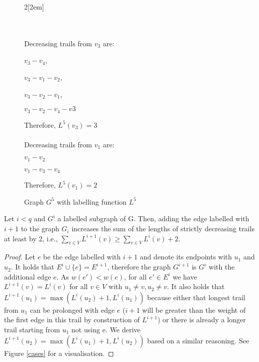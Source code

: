 \begin{isabellebody}
\begin{isamarkuptext}
\begin{figure}
	\begin{multicols}{2}[\columnsep2em] 

	\\
		\columnbreak
		\vspace{7cm}
		\ \\
		Decreasing trails from $v_3$ are: 
		
		$v_3-v_4$,  
		
		$v_3-v_1-v_2$, 
		
		$v_3-v_2-v_1$,
		
		$v_3-v_2-v_4-v3$
		
		Therefore, $L^5(v_3) = 3$\\ \ \\

		Decreasing trails from $v_1$ are:
		
		$v_1-v_2$
		
		$v_1-v_3-v_4$
		
		Therefore, $L^5(v_1) = 2$
	\end{multicols}
	
  \caption{Graph $G^5$ with labelling function $L^5$}\label{exampleSubgraph}
\end{figure}

\begin{lemma}\label{sum}
	Let $i < q$ and $G^i$ a labelled subgraph of G. Then, adding the edge labelled with $i+1$ to the 
graph $G_i$ increases the sum of the lengths of strictly decreasing trails at least by 2, i.e.,
	$\sum_{v\in V} L^{i+1}(v) \ge \sum_{v\in V} L^{i}(v)+2$.
\end{lemma}
\vspace{-1em}
\begin{proof}
Let $e$ be the edge labelled with $i+1$ and denote its endpoints with $u_1$ and $u_2$. It holds that $E^i \cup \{e\} = E^{i+1}$, 
therefore the graph $G^{i+1}$ is $G^i$ with the additional edge $e$. As $w(e') < w(e) $, for all $e' \in E^i$ we have 
 $L^{i+1}(v) = L^i(v)$ for all $v\in V$ with $u_1\neq v, u_2\neq v$. It also holds that $L^{i+1}(u_1) = \max(L^i(u_2)+1,L^i(u_1))$ 
because either that longest trail from $u_1$ can be prolonged with edge $e$ ($i+1$ will be greater than the weight of the first edge 
in this trail by construction of $L^{i+1}$) or there is already a longer trail starting from $u_1$ not using e. 
We derive $L^{i+1}(u_2) = \max(L^i(u_1)+1,L^i(u_2))$ based on a similar reasoning. See Figure \ref{cases} for a visualisation. 


\end{proof}
\end{isamarkuptext}
\end{isabellebody}
